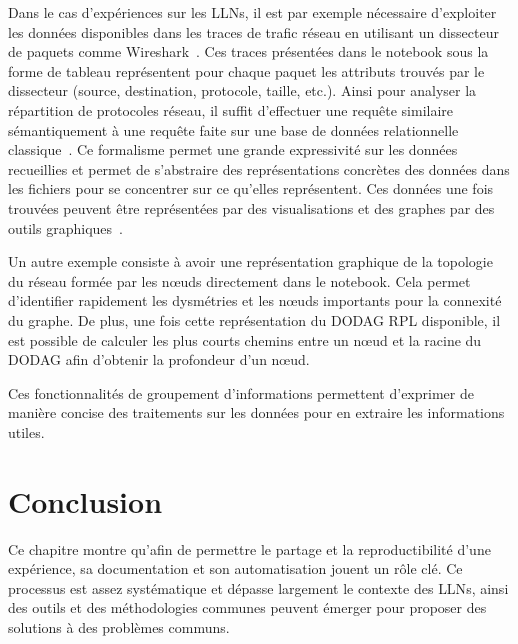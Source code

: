 Dans le cas d'expériences sur les \ac{LLN}s, il est par exemple nécessaire d'exploiter les données disponibles dans les traces de trafic réseau en utilisant un dissecteur de paquets comme Wireshark~\cite{tshark}.
Ces traces présentées dans le notebook sous la forme de tableau représentent pour chaque paquet les attributs trouvés par le dissecteur (source, destination, protocole, taille, etc.).
Ainsi pour analyser la répartition de protocoles réseau, il suffit d'effectuer une requête similaire sémantiquement à une requête faite sur une base de données relationnelle classique~\cite{mckinney2012python}.
Ce formalisme permet une grande expressivité sur les données recueillies et permet de s'abstraire des représentations concrètes des données dans les fichiers pour se concentrer sur ce qu'elles représentent.
Ces données une fois trouvées peuvent être représentées par des visualisations et des graphes par des outils graphiques~\cite{Hunter:2007}.

Un autre exemple consiste à avoir une représentation graphique de la topologie du réseau formée par les nœuds directement dans le notebook.
Cela permet d'identifier rapidement les dysmétries et les nœuds importants pour la connexité du graphe.
De plus, une fois cette représentation du \ac{DODAG} \ac{RPL} disponible, il est possible de calculer les plus courts chemins entre un nœud et la racine du \ac{DODAG} afin d'obtenir la profondeur d'un nœud.

Ces fonctionnalités de groupement d'informations permettent d'exprimer de manière concise des traitements sur les données pour en extraire les informations utiles.

\section{Conclusion} 
\label{makesense:conclusion}

Ce chapitre montre qu'afin de permettre le partage et la reproductibilité d'une expérience, sa documentation et son automatisation jouent un rôle clé.
Ce processus est assez systématique et dépasse largement le contexte des \ac{LLN}s, ainsi des outils et des méthodologies communes peuvent émerger pour proposer des solutions à des problèmes communs.

